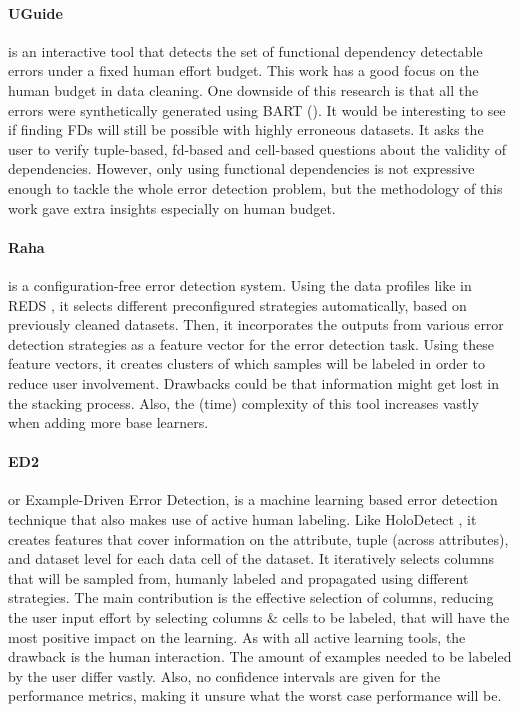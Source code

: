 \paragraph{UGuide \cite{Thirumuruganathan2017-ip}} is an interactive tool that detects the set of functional dependency detectable errors under a fixed human effort budget. This work has a good focus on the human budget in data cleaning. One downside of this research is that all the errors were synthetically generated using BART (\cite{Arocena2015-om}). It would be interesting to see if finding FDs will still be possible with highly erroneous datasets. It asks the user to verify tuple-based, fd-based and cell-based questions about the validity of dependencies. However, only using functional dependencies is not expressive enough to tackle the whole error detection problem, but the methodology of this work gave extra insights especially on human budget.


\paragraph{Raha \cite{Mahdavi2019-zf}} is a configuration-free error detection system. Using the data profiles like in REDS \cite{Mahdavi2019-pk}, it selects different preconfigured strategies automatically, based on previously cleaned datasets. Then, it incorporates the outputs from various error detection strategies as a feature vector for the error detection task. 
Using these feature vectors, it creates clusters of which samples will be labeled in order to reduce user involvement. Drawbacks could be that information might get lost in the stacking process. Also, the (time) complexity of this tool increases vastly when adding more base learners.

\paragraph{ED2 \cite{Neutatz2019-aw}} or Example-Driven Error Detection, is a machine learning based error detection technique that also makes use of active human labeling. 
Like HoloDetect \cite{Heidari2019-ox}, it creates features that cover information on the attribute, tuple (across attributes), and dataset level for each data cell of the dataset. It iteratively selects columns that will be sampled from, humanly labeled and propagated using different strategies. The main contribution is the effective selection of columns, reducing the user input effort by selecting columns \& cells to be labeled, that will have the most positive impact on the learning. As with all active learning tools, the drawback is the human interaction. The amount of examples needed to be labeled by the user differ vastly. Also, no confidence intervals are given for the performance metrics, making it unsure what the worst case performance will be. 